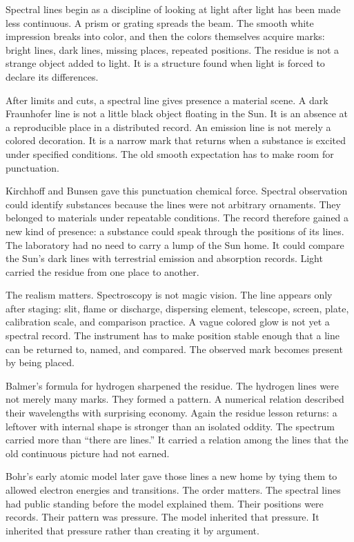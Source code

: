 Spectral lines begin as a discipline of looking at light after light has been
made less continuous. A prism or grating spreads the beam. The smooth white
impression breaks into color, and then the colors themselves acquire marks:
bright lines, dark lines, missing places, repeated positions. The residue is
not a strange object added to light. It is a structure found when light is
forced to declare its differences.

After limits and cuts, a spectral line gives presence a material scene. A dark
Fraunhofer line is not a little black object floating in the Sun. It is an
absence at a reproducible place in a distributed record. An emission line is
not merely a colored decoration. It is a narrow mark that returns when a
substance is excited under specified conditions. The old smooth expectation has
to make room for punctuation.

Kirchhoff and Bunsen gave this punctuation chemical force. Spectral
observation could identify substances because the lines were not arbitrary
ornaments. They belonged to materials under repeatable conditions. The record
therefore gained a new kind of presence: a substance could speak through the
positions of its lines. The laboratory had no need to carry a lump of the
Sun home. It could compare the Sun's dark lines with terrestrial emission and
absorption records. Light carried the residue from one place to another.

The realism matters. Spectroscopy is not magic vision. The line appears only
after staging: slit, flame or discharge, dispersing element, telescope,
screen, plate, calibration scale, and comparison practice. A vague colored
glow is not yet a spectral record. The instrument has to make position stable
enough that a line can be returned to, named, and compared. The observed mark
becomes present by being placed.

Balmer's formula for hydrogen sharpened the residue. The hydrogen lines were
not merely many marks. They formed a pattern. A numerical relation described
their wavelengths with surprising economy. Again the residue lesson returns: a
leftover with internal shape is stronger than an isolated oddity. The spectrum
carried more than ``there are lines.'' It carried a relation among the lines
that the old continuous picture had not earned.

Bohr's early atomic model later gave those lines a new home by tying them to
allowed electron energies and transitions. The order matters. The spectral
lines had public standing before the model explained them. Their positions
were records. Their pattern was pressure. The model inherited that pressure.
It inherited that pressure rather than creating it by argument.

